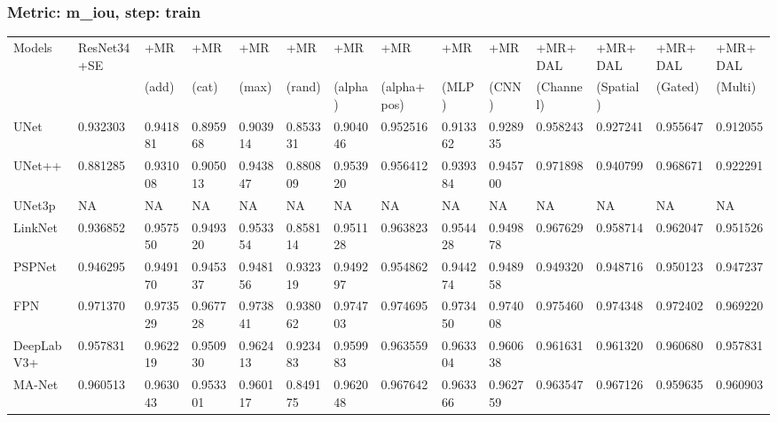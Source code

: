 \documentclass{article}
\begin{document}
\subsubsection{Metric: m\_iou, step: train}
\begin{tabular}{llllllllllllll}
\toprule
Models & ResNet34+SE & +MR  & +MR  & +MR  & +MR  & +MR  & +MR  & +MR  & +MR  & +MR+DAL & +MR+DAL & +MR+DAL & +MR+DAL \\
       &             &  (add) &  (cat) &  (max) &  (rand) &  (alpha) &  (alpha+pos) &  (MLP) &  (CNN) & (Channel) & (Spatial) & (Gated) & (Multi) \\
\midrule
UNet & 0.932303 & 0.941881 & 0.895968 & 0.903914 & 0.853331 & 0.904046 & 0.952516 & 0.913362 & 0.928935 & 0.958243 & 0.927241 & 0.955647 & 0.912055 \\
UNet++ & 0.881285 & 0.931008 & 0.905013 & 0.943847 & 0.880809 & 0.953920 & 0.956412 & 0.939384 & 0.945700 & 0.971898 & 0.940799 & 0.968671 & 0.922291 \\
UNet3p & NA & NA & NA & NA & NA & NA & NA & NA & NA & NA & NA & NA & NA \\
LinkNet & 0.936852 & 0.957550 & 0.949320 & 0.953354 & 0.858114 & 0.951128 & 0.963823 & 0.954428 & 0.949878 & 0.967629 & 0.958714 & 0.962047 & 0.951526 \\
PSPNet & 0.946295 & 0.949170 & 0.945337 & 0.948156 & 0.932319 & 0.949297 & 0.954862 & 0.944274 & 0.948958 & 0.949320 & 0.948716 & 0.950123 & 0.947237 \\
FPN & 0.971370 & 0.973529 & 0.967728 & 0.973841 & 0.938062 & 0.974703 & 0.974695 & 0.973450 & 0.974008 & 0.975460 & 0.974348 & 0.972402 & 0.969220 \\
DeepLabV3+ & 0.957831 & 0.962219 & 0.950930 & 0.962413 & 0.923483 & 0.959983 & 0.963559 & 0.963304 & 0.960638 & 0.961631 & 0.961320 & 0.960680 & 0.957831 \\
MA-Net & 0.960513 & 0.963043 & 0.953301 & 0.960117 & 0.849175 & 0.962048 & 0.967642 & 0.963366 & 0.962759 & 0.963547 & 0.967126 & 0.959635 & 0.960903 \\
\bottomrule
\end{tabular}
\end{document}
